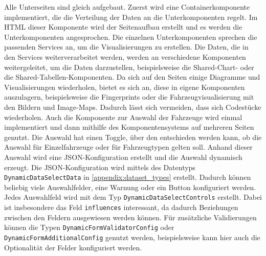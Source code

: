 Alle Unterseiten sind gleich aufgebaut. Zuerst wird eine Containerkomponente implementiert, die die Verteilung der Daten an die Unterkomponenten regelt. Im HTML dieser Komponente wird der Seitenaufbau erstellt und es werden die Unterkomponenten angesprochen. Die einzelnen Unterkomponenten sprechen die passenden Services an, um die Visualisierungen zu erstellen. Die Daten, die in den Services weiterverarbeitet werden, werden an verschiedene Komponenten weitergeleitet, um die Daten darzustellen, beispielsweise die Shared-Chart- oder die Shared-Tabellen-Komponenten. Da sich auf den Seiten einige Diagramme und Visualisierungen wiederholen, bietet es sich an, diese in eigene Komponenten auszulagern, beispielsweise die Fingerprints oder die Fahrzeugvisualisierung mit den Bildern und Image-Maps. Dadurch lässt sich vermeiden, dass sich Codestücke wiederholen. Auch die Komponente zur Auswahl der Fahrzeuge wird einmal implementiert und dann mithilfe des Komponentensystems auf mehreren Seiten genutzt. Die Auswahl hat einen Toggle, über den entschieden werden kann, ob die Auswahl für Einzelfahrzeuge oder für Fahrzeugtypen gelten soll. Anhand dieser Auswahl wird eine JSON-Konfiguration erstellt und die Auswahl dynamisch erzeugt. Die JSON-Konfiguration wird mittels des Datentyps \texttt{DynamicDataSelectData} in \ref{appendix:dataset_types} erstellt. Dadurch können beliebig viele Auswahlfelder, eine Warnung oder ein Button konfiguriert werden. Jedes Auswahlfeld wird mit dem Typ \texttt{DynamicDataSelectControls} erstellt. Dabei ist insbesondere das Feld \texttt{influences} interessant, da dadurch Beziehungen zwischen den Feldern ausgewiesen werden können. Für zusätzliche Validierungen können die Typen \texttt{DynamicFormValidatorConfig} oder \texttt{DynamicFormAdditionalConfig} genutzt werden, beispielsweise kann hier auch die Optionalität der Felder konfiguriert werden.
